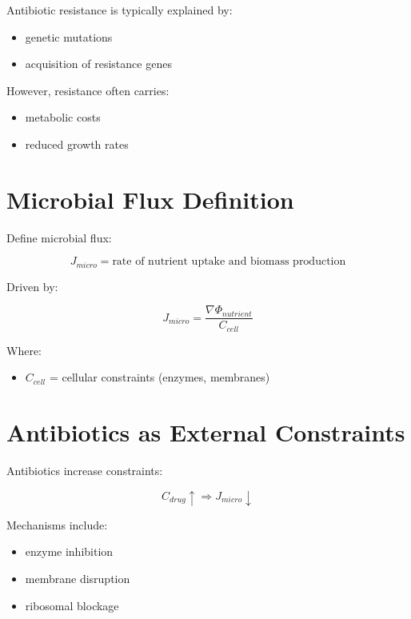 \documentclass[11pt]{article}
\begin{document}
Antibiotic resistance is typically explained by:

\begin{itemize}
    \item genetic mutations
    \item acquisition of resistance genes
\end{itemize}

However, resistance often carries:

\begin{itemize}
    \item metabolic costs
    \item reduced growth rates
\end{itemize}

\section{Microbial Flux Definition}

Define microbial flux:

\begin{equation}
J_{micro} = \text{rate of nutrient uptake and biomass production}
\end{equation}

Driven by:

\begin{equation}
J_{micro} = \frac{\nabla \Phi_{nutrient}}{C_{cell}}
\end{equation}

Where:

\begin{itemize}
    \item $C_{cell}$ = cellular constraints (enzymes, membranes)
\end{itemize}

\section{Antibiotics as External Constraints}

Antibiotics increase constraints:

\begin{equation}
C_{drug} \uparrow \Rightarrow J_{micro} \downarrow
\end{equation}

Mechanisms include:

\begin{itemize}
    \item enzyme inhibition
    \item membrane disruption
    \item ribosomal blockage
\end{itemize}
\end{document}
